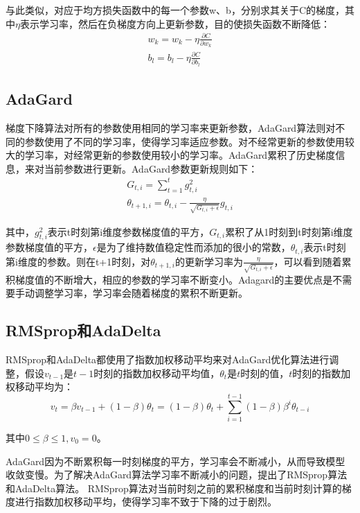 \documentclass[AutoFakeBold]{LZUThesis}
\begin{document}
与此类似，对应于均方损失函数中的每一个参数w、b，分别求其关于C的梯度，其中$\eta$表示学习率，然后在负梯度方向上更新参数，目的使损失函数不断降低：
\begin{equation}
    \begin{aligned}
        w_k=w_k-\eta \frac{\partial C}{\partial w_k} \\
        b_l=b_l-\eta \frac{\partial C}{\partial b_l}
    \end{aligned}
\end{equation}

\subsection{AdaGard}
梯度下降算法对所有的参数使用相同的学习率来更新参数，AdaGard算法则对不同的参数使用了不同的学习率，使得学习率适应参数。对不经常更新的参数使用较大的学习率，对经常更新的参数使用较小的学习率。AdaGard累积了历史梯度信息，来对当前参数进行更新。AdaGard参数更新规则如下：
\begin{equation}
    \begin{aligned}
        G_{t,i}=\sum_{t=1}^{t}g^2_{t,i} \\
        \theta_{t+1,i}=\theta_{t,i}-\frac{\eta}{\sqrt{G_{t,i}+\epsilon}}g_{t,i}
    \end{aligned}
\end{equation}

其中，$g^2_{t,i}$表示t时刻第i维度参数梯度值的平方，$ G_{t,i}$累积了从1时刻到t时刻第i维度参数梯度值的平方，$\epsilon$是为了维持数值稳定性而添加的很小的常数，$\theta_{t,i}$表示t时刻第i维度的参数。则在t+1时刻，对$\theta_{t+1,i}$的更新学习率为$\frac{\eta}{\sqrt{G_{t,i}+\epsilon}}$，可以看到随着累积梯度值的不断增大，相应的参数的学习率不断变小。Adagard的主要优点是不需要手动调整学习率，学习率会随着梯度的累积不断更新。

\subsection{RMSprop和AdaDelta}
RMSprop和AdaDelta都使用了指数加权移动平均来对AdaGard优化算法进行调整，假设$v_{t-1}$是$t-1$时刻的指数加权移动平均值，$\theta_t$是$t$时刻的值，$t$时刻的指数加权移动平均为：
\begin{equation}
    v_t=\beta v_{t-1}+(1-\beta)\theta_t=(1-\beta)\theta_t+\sum_{i=1}^{t-1}(1-\beta)\beta^i \theta_{t-i}
\end{equation}

其中$0\leq \beta \le 1, v_0=0$。

AdaGard因为不断累积每一时刻梯度的平方，学习率会不断减小，从而导致模型收敛变慢。为了解决AdaGard算法学习率不断减小的问题，提出了RMSprop算法和AdaDelta算法。
RMSprop算法对当前时刻之前的累积梯度和当前时刻计算的梯度进行指数加权移动平均，使得学习率不致于下降的过于剧烈。
\end{document}
